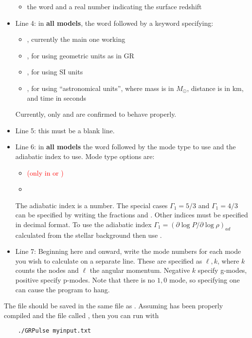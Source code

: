 \begin{itemize}
\begin{itemize}
			\item the word  and a real number indicating the surface redshift
		\end{itemize}
	\item Line 4: in {\bf all models}, the word  followed by a keyword specifying:
		\begin{itemize}
			\item {}, currently the main one working
			\item {}, for using geometric units as in GR
			\item {}, for using SI units
			\item {}, for using ``astronomical units'', where mass is in $M_\odot$, distance is in km, and time in seconds
		\end{itemize} Currently, only  and  are confirmed to behave properly.
	\item Line 5: this must be a blank line.
	\item Line 6: in {\bf all models} the word  followed by the mode type to use and the adiabatic index to use.  
		Mode type options are:
		\begin{itemize}
			\item {} \textcolor{red}{(only in  or )}
			\item {}
		\end{itemize}
		The adiabatic index is a number.  The special cases $\Gamma_1=5/3$ and $\Gamma_1=4/3$ can be specified by writing the fractions  and .  Other indices must be specified in decimal format.  To use the adiabatic index $\Gamma_1 = \left(\partial\log P/\partial\log\rho\right)_{ad}$ calculated from the stellar background then use .
	\item Line 7: Beginning here and onward, write the mode numbers for each mode you wish to calculate on a separate line.  These are specified as $\ell, k$, where $k$ counts the nodes and $\ell$ the angular momentum.  Negative $k$ specify g-modes, positive specify p-modes.  Note that there is no $1,0$ mode, so specifying one can cause the program to hang. 
\end{itemize}
The file should be saved in the same file as .  Assuming  has been properly compiled and the file called , then you can run with
\begin{verbatim}
	./GRPulse myinput.txt
\end{verbatim}

